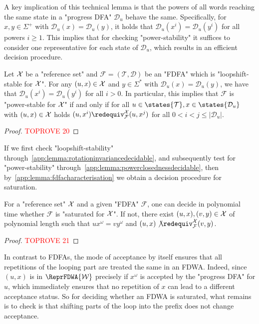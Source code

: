 \documentclass[a4paper,USenglish,cleveref,autoref,thm-restate]{lipics-v2021}
\newcommand{\mc}[1]{\ensuremath{\mathcal{#1}}}
\newcommand{\T}{\mc{T}}
\newcommand{\F}{\mc{F}}
\newcommand{\D}{\mc{D}}
\newcommand{\W}{\mc{W}}
\begin{document}
{A key implication of this technical lemma is that the powers of all words reaching the same state in a "progress DFA" $\D_u$ behave the same.
Specifically, for $x, y \in \Sigma^+$ with $\D_u(x) = \D_u(y)$, it holds that $\D_u(x^i) = \D_u(y^i)$ for all powers $i \geq 1$.
This implies that for checking "power-stability" it suffices to consider one representative for each state of $\D_u$, which results in an efficient decision procedure.

\begin{lemma}
    Let $\mathcal{X}$ be a "reference set" and $\F = (\T, \D)$ be an "FDFA" which is "loopshift-stable for $\mathcal{X}$".
    For any $(u,x) \in \mathcal{X}$ and $y \in \Sigma^*$ with $\D_u(x) = \D_u(y)$, we have that $\D_u(x^i) = \D_u(y^i)$ for all $i > 0$.
    In particular, this implies that $\F$ is "power-stable for $\mathcal{X}$" if and only if for all $u \in \states{\T}, x \in \states{\D_u}$ with $(u,x) \in \mathcal{X}$ holds $(u,x^i) \redequiv^\X_\F (u,x^j)$ for all $0 < i < j \leq |\D_u|$.\label{app:lemma:powerclosednessdecidable}
\end{lemma}
\begin{proof}\textcolor{red}{TOPROVE 20}\end{proof}

If we first check "loopshift-stability" through~\cref{app:lemma:rotationinvariancedecidable}, and subsequently test for "power-stability" through~\cref{app:lemma:powerclosednessdecidable}, then by~\cref{app:lemma:fdfacharacterisation} we obtain a decision procedure for saturation.
\begin{theorem}
    For a "reference set" $\mathcal{X}$ and a given "FDFA" $\F$, one can decide in polynomial time whether $\F$ is "saturated for $\mathcal{X}$".
    If not, there exist $(u,x),(v,y) \in \mathcal{X}$ of polynomial length such that $ux^\omega = vy^\omega$ and $(u,x) \not\redequiv^\X_\F (v,y)$.
  \label{app:theorem:ptimesaturationFDFA}
\end{theorem}
\begin{proof}\textcolor{red}{TOPROVE 21}\end{proof}

In contrast to FDFAs, the mode of acceptance by itself ensures that all repetitions of the looping part are treated the same in an FDWA.
Indeed, since $(u,x)$ is in $\ReprFDWA{\W}$ precisely if $x^\omega$ is accepted by the "progress DFA" for $u$, which immediately ensures that no repetition of $x$ can lead to a different acceptance status.
So for deciding whether an FDWA is saturated, what remains is to check is that shifting parts of the loop into the prefix does not change acceptance.

}
\end{document}
